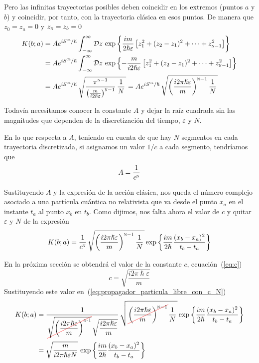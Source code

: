 Pero las infinitas trayectorias posibles deben coincidir en los
extremos (puntos $a$ y $b$) y coincidir, por tanto, con la trayectoria
clásica en esos puntos. De manera que $z_0 = z_a = 0$ y
$z_{\textsc{n}} = z_b = 0$
\begin{align*}
  K(b;a)
  &=
    A e^{iS^{\textsc{cl}}/\hslash}\int_{-\infty}^{\infty} \mathcal{D}z\,
    \exp\left\{
    \dfrac{im}{2\hslash\varepsilon}
    \left[
    z_1^2 + (z_2-z_1)^2 + \cdots + z_{\textsc{n}-1}^2
    \right] 
    \right\}\\
  &=
    A e^{iS^{\textsc{cl}}/\hslash}
    \int_{-\infty}^{\infty} \mathcal{D}z\,
    \exp\left\{
    -\dfrac{m}{i2\hslash\varepsilon}
    \left[
    z_1^2 + (z_2-z_1)^2 + \cdots + z_{\textsc{n}-1}^2
    \right] 
    \right\}\\
  &=
    A e^{iS^{\textsc{cl}}/\hslash}\,
    \sqrt{
    \dfrac{\pi^{\textsc{n}-1}}
    {\left(\frac{m}{i2\hslash\varepsilon}\right)^{\textsc{n}-1}}
    \,\dfrac{1}{N}\kern1.5pt}
  =
    A e^{iS^{\textsc{cl}}/\hslash}\,
    \sqrt{
    \left(\dfrac{i2\pi\hslash\varepsilon}{m}\right)^{\textsc{n}-1}
    \dfrac{1}{N}\kern1.5pt}
\end{align*}

Todavía necesitamos conocer la constante $A$ y dejar la raíz cuadrada
sin las magnitudes que dependen de la discretización del tiempo,
$\varepsilon$ y $N$.

En lo que respecta a $A$, teniendo en cuenta de que hay $N$ segmentos
en cada trayectoria discretizada, si asignamos un valor $1/c$ a cada
segmento, tendríamos que
\[
  A = \dfrac{1}{c^{\textsc{n}}}
\]

Sustituyendo $A$ y la expresión de la acción clásica, nos queda el
número complejo asociado a una partícula cuántica no relativista que
va desde el punto $x_a$ en el instante $t_a$ al punto $x_b$ en $t_b$.
Como dijimos, nos falta ahora el valor de $c$ y quitar $\varepsilon$ y
$N$ de la expresión
\begin{equation}\label{eq:propagador_particula_libre_con_c_N}
  K(b;a)
  =
  \dfrac{1}{c^{\textsc{n}}}\,
    \sqrt{
    \left(\dfrac{i2\pi\hslash\varepsilon}{m}\right)^{\textsc{n}-1}
  \dfrac{1}{N}\kern1.5pt}
  \exp\left\{\frac{im}{2\hslash}\dfrac{(x_b-x_a)^2}{t_b-t_a}\right\}
\end{equation}

En la próxima sección se obtendrá el valor de la constante $c$,
ecuación~(\ref{eq:c})
\[
  c = \sqrt{\dfrac{i2\pi\hslash\varepsilon}{m}}
\]
Sustituyendo este valor en~(\ref{eq:propagador_particula_libre_con_c_N})
\begin{align*}
  K(b;a)
  &=
  \dfrac{1}{\cancelout{\sqrt{\left(\dfrac{i2\pi\hslash\varepsilon}{m}\right)^{\textsc{n-1}}}}\sqrt{\dfrac{i2\pi\hslash\varepsilon}{m}}}\,
  \sqrt{
  \cancelout{\left(\dfrac{i2\pi\hslash\varepsilon}{m}\right)^{\textsc{n}-1}}
  \dfrac{1}{N}\kern1.5pt}
  \exp\left\{\frac{im}{2\hslash}\dfrac{(x_b-x_a)^2}{t_b-t_a}\right\}\\
  &=
    \sqrt{\dfrac{m}{i2\pi\hslash\varepsilon N}}\,
    \exp\left\{\frac{im}{2\hslash}\dfrac{(x_b-x_a)^2}{t_b-t_a}\right\}
\end{align*}

